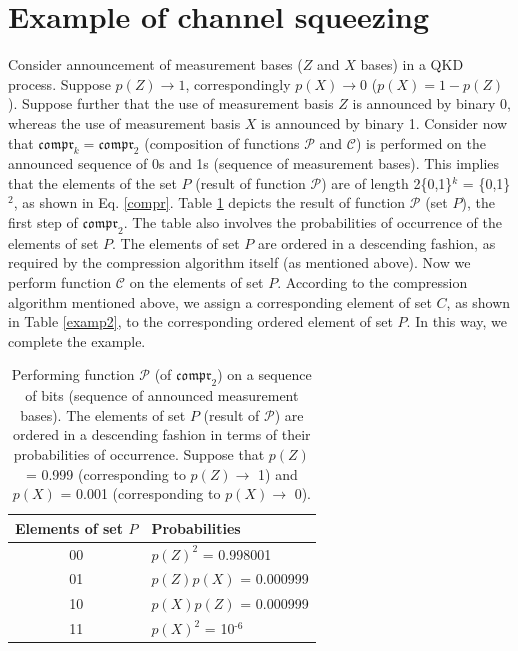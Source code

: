 \documentclass[journal,onecolumn]{IEEEtran}
\theoremstyle{thmstyleone}%
\theoremstyle{thmstyletwo}%
\theoremstyle{thmstylethree}%
\begin{document}
	
	
	
	
	
	
	
	

	
	
	
	
	\ifCLASSOPTIONcaptionsoff
	\newpage
	\fi
	
	\appendices
		\section{Example of channel squeezing}
		\label{app2}
		\indent Consider announcement of measurement bases ($Z$ and $X$ bases) in a QKD process. Suppose $p(Z)\rightarrow\text{1}$, correspondingly $p(X)\rightarrow\text{0}$ ($p(X) = \text{1} - p(Z)$). Suppose further that the use of measurement basis $Z$ is announced by binary 0, whereas the use of measurement basis $X$ is announced by binary 1. Consider now that $\mathfrak{compr}_k=\mathfrak{compr}_{\text{2}}$ (composition of functions $\mathcal{P}$ and $\mathcal{C}$) is performed on the announced sequence of 0s and 1s (sequence of measurement bases). This implies that the elements of the set $P$ (result of function $\mathcal{P}$) are of length 2\textemdash \{0,1\}$^k$ = \{0,1\}$^{\text{2}}$, as shown in Eq. \eqref{compr}. Table \ref{examp1} depicts the result of function $\mathcal{P}$ (set $P$), the first step of $\mathfrak{compr}_{\text{2}}$. The table also involves the probabilities of occurrence of the elements of set $P$. The elements of set $P$ are ordered in a descending fashion, as required by the compression algorithm itself (as mentioned above). Now we perform function $\mathcal{C}$ on the elements of set $P$. According to the compression algorithm mentioned above, we assign a corresponding element of set $C$, as shown in Table \ref{examp2}, to the corresponding ordered element of set $P$. In this way, we complete the example.    \\
		\begin{table}[!hbt]
			\centering
			\caption{\label{examp1}%
				Performing function $\mathcal{P}$ (of $\mathfrak{compr}_{\text{2}}$) on a sequence of bits (sequence of announced measurement bases). The elements of set $P$ (result of $\mathcal{P}$) are ordered in a descending fashion in terms of their probabilities of occurrence. Suppose that $p(Z)$ = 0.999 (corresponding to $p(Z)\rightarrow$ 1) and $p(X)$ = 0.001 (corresponding to $p(X)\rightarrow$ 0).}
			
			\begin{tabular}{cl}
				
				\toprule
				Elements of set $P$ & Probabilities \\
				\toprule
				00 & $p(Z)^{\text{2}}$ = 0.998001 \\
				01 & $p(Z)p(X)$ = 0.000999 \\
				10 & $p(X)p(Z)$ = 0.000999 \\
				11 & $p(X)^{\text{2}}$ = 10$^{\text{-6}}$ \\
				\bottomrule
			\end{tabular}
			
		\end{table}
		
\end{document}
